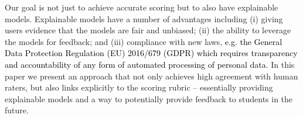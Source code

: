 \documentclass[11pt,a4paper]{article}
\newcommand{\AC}{\textcolor{black}} %
\newcommand{\AV}{\textcolor{red}} %
\begin{document}
Our goal is not just to achieve accurate scoring but to also have explainable models. Explainable models have a number of advantages including (i) giving users evidence that the models are fair and unbiased; (ii) the ability to leverage the models for feedback; and (iii) compliance with new laws, \AC{e.g. the General Data Protection Regulation (EU) 2016/679 (GDPR) which requires transparency and accountability of any form of automated processing of personal data}. In this paper we present an approach that not only achieves high agreement with human raters, but also links explicitly to the scoring rubric -- essentially providing explainable models and a way to potentially provide feedback to students in the future. %
\end{document}
